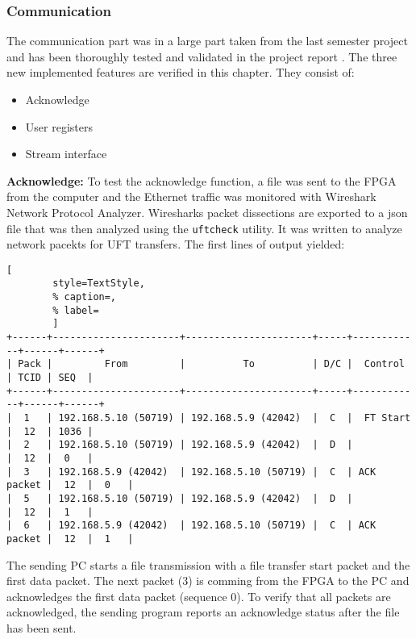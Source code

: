 \subsubsection*{Communication}
The communication part was in a large part taken from the last semester project
and has been thoroughly tested and validated in the project report 
\cite{p5report}. The three new implemented features are verified in this
chapter. They consist of:
\begin{itemize}
    \item Acknowledge
    \item User registers
    \item Stream interface
\end{itemize}

\vspace{1ex}
\textbf{Acknowledge:} To test the acknowledge function, a file was sent to the
FPGA from the computer
and the Ethernet traffic was monitored with Wireshark Network Protocol Analyzer.
Wiresharks packet dissections are exported to a json file that was then analyzed
using the \texttt{uftcheck} utility. It was written to analyze network pacekts
for UFT transfers. The first lines of output yielded:

\vspace{1ex}
\begin{minipage}{1\linewidth}
    \begin{lstlisting}[
        style=TextStyle, 
        % caption=, 
        % label=
        ]
+------+----------------------+----------------------+-----+------------+------+------+
| Pack |         From         |          To          | D/C |  Control   | TCID | SEQ  | 
+------+----------------------+----------------------+-----+------------+------+------+
|  1   | 192.168.5.10 (50719) | 192.168.5.9 (42042)  |  C  |  FT Start  |  12  | 1036 |
|  2   | 192.168.5.10 (50719) | 192.168.5.9 (42042)  |  D  |            |  12  |  0   |
|  3   | 192.168.5.9 (42042)  | 192.168.5.10 (50719) |  C  | ACK packet |  12  |  0   |
|  5   | 192.168.5.10 (50719) | 192.168.5.9 (42042)  |  D  |            |  12  |  1   |
|  6   | 192.168.5.9 (42042)  | 192.168.5.10 (50719) |  C  | ACK packet |  12  |  1   |
\end{lstlisting}
\end{minipage}

\vspace{1ex}
The sending PC starts a file transmission with a file transfer start packet and
the first data packet. The next packet (3) is comming from the FPGA to the PC
and acknowledges the first data packet (sequence 0). To verify that all packets
are acknowledged, the sending program reports an acknowledge status after the
file has been sent. 

